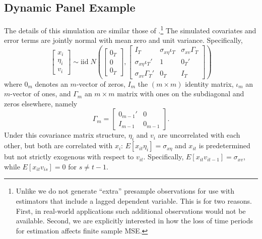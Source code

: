 \subsection{Dynamic Panel Example}
The details of this simulation are similar those of \cite{AndrewsLu}.\footnote{Unlike \cite{AndrewsLu} we do not generate ``extra'' presample observations for use with estimators that include a lagged dependent variable. This is for two reasons. First, in real-world applications such additional observations would not be available. Second, we are explicitly interested in how the loss of time periods for estimation affects finite sample MSE.} 
The simulated covariates and error terms are jointly normal with mean zero and unit variance. 
Specifically,
	\begin{equation}
	\label{eq:covar}
		\left[\begin{array}{c}
			x_{i}\\
			\eta_i\\
			v_{i}
	 \end{array} \right]\sim \mbox{iid}\; N\left(\left[\begin{array}{c}0_T\\ 0\\ 0_T \end{array}\right] ,\left[\begin{array}{ccc}
	 	 I_T & \sigma_{x\eta}\iota_T&\sigma_{xv}\Gamma_T \\
	 		\sigma_{x\eta}\iota_T'& 1&0_T' \\
	 		\sigma_{xv}\Gamma_T'& 0_T&  I_T
	 \end{array}\right]\right)
	\end{equation}
where $0_m$ denotes an $m$-vector of zeros, $I_m$ the $(m\times m)$ identity matrix, $\iota_m$ an $m$-vector of ones, and $\Gamma_m$ an $m\times m$ matrix with ones on the subdiagonal and zeros elsewhere, namely
	\begin{equation}
		\Gamma_m = \left[\begin{array}{cc}
	 	0_{m-1}' & 0\\
	 	I_{m-1} & 0_{m-1}
	 \end{array}\right].
	\end{equation}
Under this covariance matrix structure, $\eta_i$ and $v_{i}$ are uncorrelated with each other, but both are correlated with $x_{i}$: $E[x_{it}\eta_i]=\sigma_{x\eta}$ and $x_{it}$ is predetermined but not strictly exogenous with respect to $v_{it}$. Specifically, $E[x_{it}v_{it-1}]=\sigma_{xv}$, while $E[x_{it}v_{is}]=0$ for $s\neq t-1$. 

